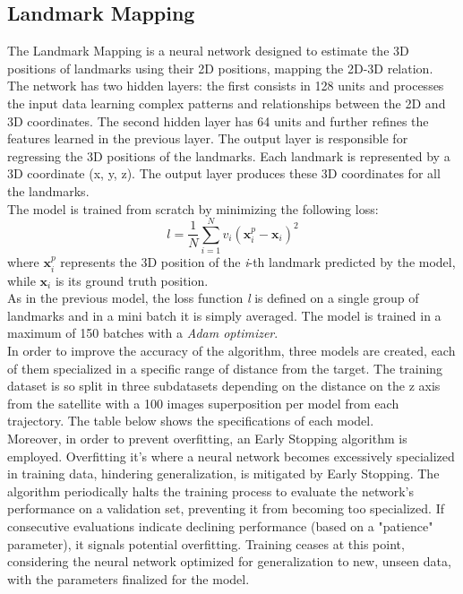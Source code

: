 \subsection{Landmark Mapping}
The Landmark Mapping is a neural network designed to estimate the 3D positions of landmarks using their 2D positions, mapping the 2D-3D relation.\\
The network has two hidden layers: the first consists in 128 units and processes the input data learning complex patterns and relationships between the 2D and 3D coordinates. The second hidden layer has 64 units and further refines the features learned in the previous layer. The output layer is responsible for regressing the 3D positions of the landmarks. Each landmark is represented by a 3D coordinate (x, y, z). The output layer produces these 3D coordinates for all the landmarks.\\
The model is trained from scratch by minimizing the following loss:
\[l = \frac{1}{N}\sum_{i=1}^N v_i(\textbf{x}_{i}^p - \textbf{x}_{i})^2\]
where \(\textbf{x}_{i}^p\) represents the 3D position of the \textit{i}-th landmark predicted by the model, while \(\textbf{x}_{i}\) is its ground truth position.\\
As in the previous model, the loss function \textit{l} is defined on a single group of landmarks and in a mini batch it is simply averaged. The model is trained in a maximum of 150 batches with a \textit{Adam optimizer}.\\
In order to improve the accuracy of the algorithm, three models are created, each of them specialized in a specific range of distance from the target.
The training dataset is so split in three subdatasets depending on the distance on the z axis from the satellite with a 100 images superposition per model from each trajectory. The table below shows the specifications of each model.\\
Moreover, in order to prevent overfitting, an Early Stopping algorithm is employed. Overfitting it's where a neural network becomes excessively specialized in training data, hindering generalization, is mitigated by Early Stopping. The algorithm periodically halts the training process to evaluate the network's performance on a validation set, preventing it from becoming too specialized. If consecutive evaluations indicate declining performance (based on a "patience" parameter), it signals potential overfitting. Training ceases at this point, considering the neural network optimized for generalization to new, unseen data, with the parameters finalized for the model.

